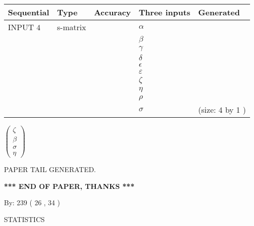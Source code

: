 \documentclass[12pt]{article}
\begin{document}
  
\noindent\begin{tabular}{|l|l|l|l|l|}
\hline
 Sequential & Type & Accuracy & Three inputs & Generated \\ 
\hline
 
 
  INPUT $            4 $ & s-matrix & & 
 $  \alpha $ & 
  \\
  & & & 
 $  \beta $ & 
  \\
  & & & 
 $  \gamma $ & 
  \\
  & & & 
 $  \delta $ & 
  \\
  & & & 
 $  \epsilon $ & 
  \\
  & & & 
 $  \varepsilon $ & 
  \\
  & & & 
 $                     \zeta $ & 
  \\
  & & & 
 $  \eta $ & 
  \\
  & & & 
 $  \rho $ & 
  \\
  & & & 
 $  \sigma $ & 
  (size:            4  by            1 )
 \\  \hline  
 \end{tabular}
   
   
 $  \left( \begin{array}
 {
 c
 }
                    \zeta \\ 
 \beta \\ 
 \sigma \\ 
 \eta
 \end{array} \right) $ 
   
   
   
   
 \vspace{0.2in}
 
   
   
\vspace{2.0in} PAPER TAIL GENERATED.
   
   
   
   
\vspace{1.0in} 
{\textbf{\large{ *** END OF PAPER, THANKS *** }}} 
   
   
\hspace{1.0in} By: 
         239 (          26 ,           34 )
   
   
   
\vspace{0.2in}
\vspace{0.2in}
   
   
 \newpage
\setcounter{page}{1} 
   
   
 {\LARGE{STATISTICS}}
   
\vspace{0.2in}
   
\end{document}
